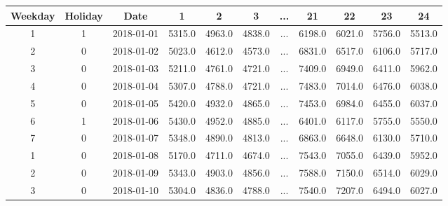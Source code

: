 \begin{table}[ht!]
\centering
\begin{tabular}{|c|c|c|c|c|c|c|c|c|c|c|}
\hline
\textbf{Weekday} & \textbf{Holiday} & \textbf{Date} & \textbf{1} & \textbf{2} & \textbf{3} & \textbf{...} & \textbf{21} & \textbf{22} & \textbf{23} & \textbf{24} \\ \hline
1                & 1                & 2018-01-01    & 5315.0     & 4963.0     & 4838.0     & ...          & 6198.0      & 6021.0      & 5756.0      & 5513.0      \\ \hline
2                & 0                & 2018-01-02    & 5023.0     & 4612.0     & 4573.0     & ...          & 6831.0      & 6517.0      & 6106.0      & 5717.0      \\ \hline
3                & 0                & 2018-01-03    & 5211.0     & 4761.0     & 4721.0     & ...          & 7409.0      & 6949.0      & 6411.0      & 5962.0      \\ \hline
4                & 0                & 2018-01-04    & 5307.0     & 4788.0     & 4721.0     & ...          & 7483.0      & 7014.0      & 6476.0      & 6038.0      \\ \hline
5                & 0                & 2018-01-05    & 5420.0     & 4932.0     & 4865.0     & ...          & 7453.0      & 6984.0      & 6455.0      & 6037.0      \\ \hline
6                & 1                & 2018-01-06    & 5430.0     & 4952.0     & 4885.0     & ...          & 6401.0      & 6117.0      & 5755.0      & 5550.0      \\ \hline
7                & 0                & 2018-01-07    & 5348.0     & 4890.0     & 4813.0     & ...          & 6863.0      & 6648.0      & 6130.0      & 5710.0      \\ \hline
1                & 0                & 2018-01-08    & 5170.0     & 4711.0     & 4674.0     & ...          & 7543.0      & 7055.0      & 6439.0      & 5952.0      \\ \hline
2                & 0                & 2018-01-09    & 5343.0     & 4903.0     & 4856.0     & ...          & 7588.0      & 7150.0      & 6514.0      & 6029.0      \\ \hline
3                & 0                & 2018-01-10    & 5304.0     & 4836.0     & 4788.0     & ...          & 7540.0      & 7207.0      & 6494.0      & 6027.0      \\ \hline
\end{tabular}
\end{table}

